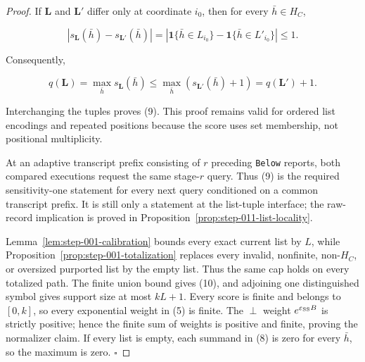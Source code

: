 \begin{proof}
If \(\mathbf L\) and \(\mathbf L'\) differ only at coordinate
\(i_0\), then for every \(\bar h\in H_C\),

\[
 |s_{\mathbf L}(\bar h)-s_{\mathbf L'}(\bar h)|
 =|\mathbf1\{\bar h\in L_{i_0}\}
   -\mathbf1\{\bar h\in L'_{i_0}\}|
 \leq1.
 \tag{11}
\]

Consequently,

\[
 q(\mathbf L)
 =\max_{\bar h}s_{\mathbf L}(\bar h)
 \leq\max_{\bar h}(s_{\mathbf L'}(\bar h)+1)
 =q(\mathbf L')+1.
\]

Interchanging the tuples proves (9). This proof remains valid for ordered
list encodings and repeated positions because the score uses set
membership, not positional multiplicity.

At an adaptive transcript prefix consisting of \(r\) preceding \texttt{Below}
reports, both compared executions request the same stage-\(r\) query. Thus
(9) is the required sensitivity-one statement for every next query
conditioned on a common transcript prefix. It is still only a statement at
the list-tuple interface; the raw-record implication is proved in
Proposition~\ref{prop:step-011-list-locality}.

Lemma~\ref{lem:step-001-calibration} bounds every exact current
list by \(L\), while Proposition~\ref{prop:step-001-totalization} replaces every invalid,
nonfinite, non-\(H_C\), or oversized purported list by the empty list. Thus
the same cap holds on every totalized path. The finite union bound gives
(10), and adjoining one distinguished symbol gives support size at most
\(kL+1\). Every score is finite and belongs to \([0,k]\), so every
exponential weight in (5) is finite. The \(\perp\) weight
\(e^{\varepsilon_{\rm SS}B}\) is strictly positive; hence the finite sum of
weights is positive and finite, proving the normalizer claim. If every
list is empty, each summand in (8) is zero for every \(\bar h\), so the
maximum is zero. \(\square\)


\end{proof}

